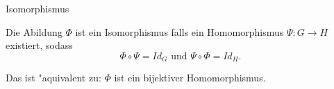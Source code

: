 \documentclass[class=article, crop=false]{standalone}
\begin{document}
\begin{zettel}{Isomorphismus}
\begin{flashcard}
    \begin{definition}[Isomorphismus]
        Die Abildung $\Phi$ ist ein Isomorphismus falls ein Homomorphismus $\Psi: G \longrightarrow H$ existiert, sodass
\[
    \Phi \circ \Psi = Id_G \text{ und } \Psi \circ \Phi =  Id_H 
.\]

Das ist "aquivalent zu: $\Phi$ ist ein bijektiver Homomorphismus.
\end{definition}
\end{flashcard}
\end{zettel}
\end{document}
